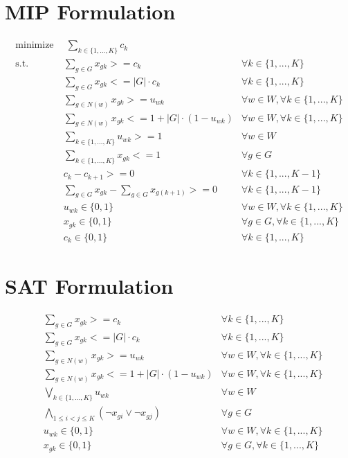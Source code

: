 \section{MIP Formulation}

\begin{align}
\label{eq_MIP_cf:f.0} \mbox{minimize}~& \;\sum_{k\in \{1,...,K\}} c_{k}& \\
\label{eq_MIP_cf:f.1} \mbox{s.t. } &\sum_{g \in G}x_{gk} >= c_{k} & \forall k\in \{1,...,K\}\\
\label{eq_MIP_cf:f.2}&\sum_{g\in G}x_{gk} <= |G|\cdot  c_{k} & \forall k\in \{1,...,K\}\\
\label{eq_MIP_cf:f.3}&\sum_{g\in N(w)}x_{gk} >= u_{wk} & \forall w\in W, \forall k\in \{1,...,K\}\\
\label{eq_MIP_cf:f.4}&\sum_{g\in N(w)}x_{gk} <= 1 + |G|\cdot  (1-u_{wk}) & \forall w\in W, \forall k\in \{1,...,K\}\\
\label{eq_MIP_cf:f.5}&\sum_{k\in \{1,...,K\}}u_{wk} >= 1 & \forall w\in W\\
\label{eq_MIP_cf:f.6}&\sum_{k\in \{1,...,K\}}x_{gk} <= 1 & \forall g\in G\\
\label{eq_MIP_cf:f.7}&c_{k} - c_{k+1} >= 0 & \forall k\in \{1,...,K-1\}\\
\label{eq_MIP_cf:f.8}&\sum_{g\in G}x_{gk} - \sum_{g\in G}x_{g(k+1)} >= 0 & \forall k\in \{1,...,K-1\}\\
\label{eq_MIP_cf:f.9}& u_{wk} \in \{0,1\} & \forall w\in W, \forall k\in \{1,...,K\}\\
\label{eq_MIP_cf:f.10}& x_{gk} \in \{0,1\} & \forall g\in G, \forall k\in \{1,...,K\}\\
\label{eq_MIP_cf:f.11}& c_{k}\in \{0,1\} & \forall k\in \{1,...,K\}
\end{align}



\section{SAT Formulation}

\begin{align}
\label{eq_SAT_cf:f.0}&\sum_{g \in G}x_{gk} >= c_{k} & \forall k\in \{1,...,K\}\\
\label{eq_SAT_cf:f.1}&\sum_{g\in G}x_{gk} <= |G|\cdot  c_{k} & \forall k\in \{1,...,K\}\\
\label{eq_SAT_cf:f.2}&\sum_{g\in N(w)}x_{gk} >= u_{wk} & \forall w\in W, \forall k\in \{1,...,K\}\\
\label{eq_SAT_cf:f.3}&\sum_{g\in N(w)}x_{gk} <= 1 + |G|\cdot  (1-u_{wk}) & \forall w\in W, \forall k\in \{1,...,K\}\\
\label{eq_SAT_cf:f.4}&\bigvee_{k\in \{1,...,K\}}u_{wk} & \forall w\in W\\
\label{eq_SAT_cf:f.5}&\bigwedge_{1 \leq i < j \leq K} (\lnot x_{gi} \lor \lnot x_{gj}) & \forall g\in G\\
\label{eq_SAT_cf:f.6}& u_{wk} \in \{0,1\} & \forall w\in W, \forall k\in \{1,...,K\}\\
\label{eq_SAT_cf:f.7}& x_{gk} \in \{0,1\} & \forall g\in G, \forall k\in \{1,...,K\}\\
\end{align}

